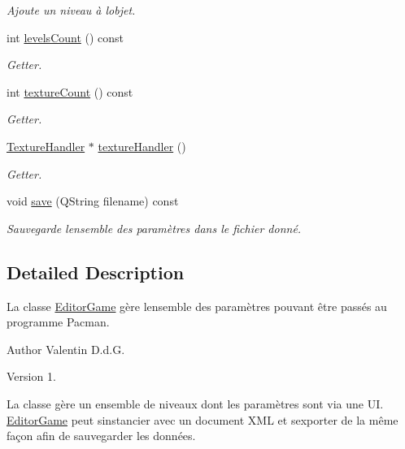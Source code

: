 \begin{DoxyCompactItemize}
\begin{DoxyCompactList}\small\item\em Ajoute un niveau à l\textquotesingle{}objet. \end{DoxyCompactList}\item 
int \hyperlink{class_editor_game_a84465e0451cf75b8732630452263584c}{levels\+Count} () const 
\begin{DoxyCompactList}\small\item\em Getter. \end{DoxyCompactList}\item 
int \hyperlink{class_editor_game_afb6b6a5ac54114f098d840592f64c6cb}{texture\+Count} () const 
\begin{DoxyCompactList}\small\item\em Getter. \end{DoxyCompactList}\item 
\hyperlink{class_texture_handler}{Texture\+Handler} $\ast$ \hyperlink{class_editor_game_acc719e48b13201125f52dbddb530e77e}{texture\+Handler} ()
\begin{DoxyCompactList}\small\item\em Getter. \end{DoxyCompactList}\item 
void \hyperlink{class_editor_game_a181792868a77319e18860e4887a15bd3}{save} (Q\+String filename) const 
\begin{DoxyCompactList}\small\item\em Sauvegarde l\textquotesingle{}ensemble des paramètres dans le fichier donné. \end{DoxyCompactList}\end{DoxyCompactItemize}


\subsection{Detailed Description}
La classe \hyperlink{class_editor_game}{Editor\+Game} gère l\textquotesingle{}ensemble des paramètres pouvant être passés au programme Pacman. 

\begin{DoxyAuthor}{Author}
Valentin D.\+d.\+G. 
\end{DoxyAuthor}
\begin{DoxyVersion}{Version}
1.
\end{DoxyVersion}
La classe gère un ensemble de niveaux dont les paramètres sont via une U\+I. \hyperlink{class_editor_game}{Editor\+Game} peut s\textquotesingle{}instancier avec un document X\+M\+L et s\textquotesingle{}exporter de la même façon afin de sauvegarder les données. 

